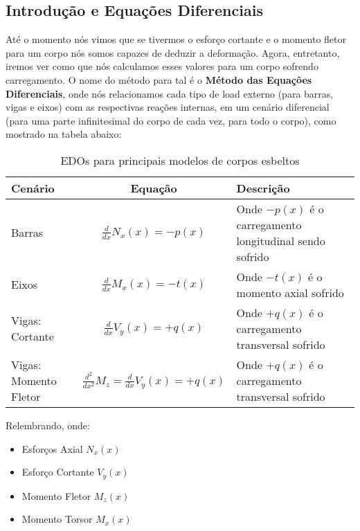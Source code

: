 \documentclass{article}
\begin{document}
            \subsection{Introdução e Equações Diferenciais}
                Até o momento nós vimos que se tivermos o esforço cortante e o momento fletor para um corpo nós somos capazes de deduzir a deformação. Agora, entretanto, iremos ver como que nós calculamos
                esses valores para um corpo sofrendo carregamento. O nome do método para tal é o \textbf{Método das Equações Diferenciais}, onde nós relacionamos cada tipo de load externo (para barras,
                vigas e eixos) com as respectivas reações internas, em um cenário diferencial (para uma parte infinitesimal do corpo de cada vez, para todo o corpo), como mostrado na tabela abaixo:

                \begin{table}[h]
                    \centering
                    \begin{tabular}{|l|c|l|}\hline
                        \textbf{Cenário} & \textbf{Equação} & \textbf{Descrição}\\ \hline
                        \rule{0pt}{4ex} Barras & $\frac{d}{dx}N_x(x) = -p(x)$ & Onde $-p(x)$ é o carregamento longitudinal sendo sofrido \\[2ex]  \hline
                        \rule{0pt}{4ex} Eixos  & $\frac{d}{dx}M_x(x) = -t(x)$ & Onde $-t(x)$ é o momento axial sofrido \\[2ex]\hline
                        \rule{0pt}{4ex} Vigas: Cortante & $\frac{d}{dx}V_y(x) = +q(x)$ & Onde $+q(x)$ é o carregamento transversal sofrido \\[2ex] \hline
                        \rule{0pt}{4ex} Vigas: Momento Fletor & $\frac{d^2}{dx^2}M_z = \frac{d}{dx}V_y(x) = +q(x)$ & Onde $+q(x)$ é o carregamento transversal sofrido \\[2ex] \hline
                        
                    \end{tabular}
                    \caption{EDOs para principais modelos de corpos esbeltos}
                    \label{tb:edo_esf_internos}
                \end{table}

                Relembrando, onde:
                \begin{itemize}
                    \item Esforços Axial $N_x(x)$
                    \item Esforço Cortante $V_y(x)$
                    \item Momento Fletor $M_z(x)$
                    \item Momento Torsor $M_x(x)$
                \end{itemize}
\end{document}

